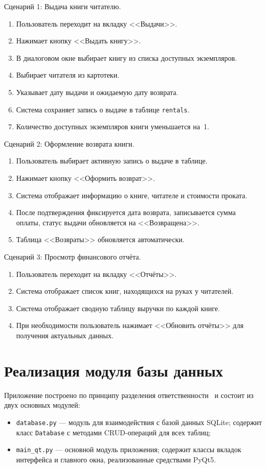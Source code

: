 \documentclass[14pt]{extreport}
\begin{document}
	Сценарий 1: Выдача книги читателю.
	\begin{enumerate}
		\item Пользователь переходит на вкладку <<Выдачи>>.
		\item Нажимает кнопку <<Выдать книгу>>.
		\item В диалоговом окне выбирает книгу из списка доступных экземпляров.
		\item Выбирает читателя из картотеки.
		\item Указывает дату выдачи и ожидаемую дату возврата.
		\item Система сохраняет запись о выдаче в таблице \texttt{rentals}.
		\item Количество доступных экземпляров книги уменьшается на~1.
	\end{enumerate}
	
	Сценарий 2: Оформление возврата книги.
	\begin{enumerate}
		\item Пользователь выбирает активную запись о выдаче в таблице.
		\item Нажимает кнопку <<Оформить возврат>>.
		\item Система отображает информацию о книге, читателе и стоимости проката.
		\item После подтверждения фиксируется дата возврата, записывается сумма оплаты, статус выдачи обновляется на <<Возвращена>>.
		\item Таблица <<Возвраты>> обновляется автоматически.
	\end{enumerate}
	
	Сценарий 3: Просмотр финансового отчёта.
	\begin{enumerate}
		\item Пользователь переходит на вкладку <<Отчёты>>.
		\item Система отображает список книг, находящихся на руках у читателей.
		\item Система отображает сводную таблицу выручки по каждой книге.
		\item При необходимости пользователь нажимает <<Обновить отчёты>> для получения актуальных данных.
	\end{enumerate}
	
	
	\chapter{Реализация модуля базы данных}
	
	Приложение построено по принципу разделения ответственности~\cite{bib4} и состоит из двух основных модулей:
	\begin{itemize}
		\item \texttt{database.py} --- модуль для взаимодействия с базой данных SQLite; содержит класс \texttt{Database} с методами CRUD-операций для всех таблиц;
		\item \texttt{main\_qt.py} --- основной модуль приложения; содержит классы вкладок интерфейса и главного окна, реализованные средствами PyQt5.
	\end{itemize}
	
\end{document}
